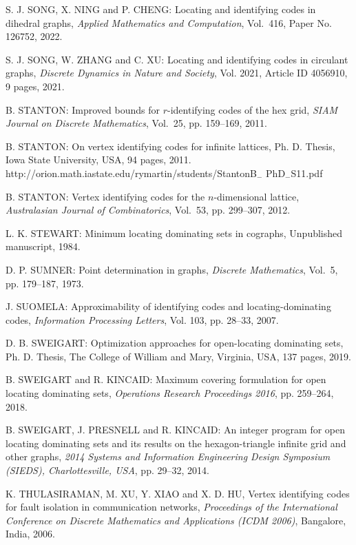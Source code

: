 \begin{thebibliography}{999}
S. J. SONG, X. NING and P. CHENG: Locating and identifying codes in dihedral graphs, {\it Applied Mathematics and Computation}, Vol.~416, Paper No. 126752, 2022.

S. J. SONG, W. ZHANG and C. XU: Locating and identifying codes in circulant graphs, {\it Discrete Dynamics in Nature and Society}, Vol. 2021, Article ID 4056910, 9 pages, 2021.

B. STANTON: Improved bounds for $r$-identifying codes of the hex grid, {\it SIAM Journal on Discrete Mathematics}, Vol.~25, pp. 159--169, 2011.

B. STANTON: On vertex identifying codes for infinite lattices, Ph. D. Thesis, Iowa State University, USA, 94 pages, 2011.\\
http://orion.math.iastate.edu/rymartin/students/StantonB$_{-}$ PhD$_{-}$S11.pdf

B. STANTON: Vertex identifying codes for the $n$-dimensional lattice, {\it Australasian Journal of Combinatorics}, Vol.~53, pp. 299--307, 2012.

L. K. STEWART: Minimum locating dominating sets in cographs, Unpublished manuscript, 1984.

 D. P. SUMNER: Point determination in graphs, {\it Discrete Mathematics}, Vol.~5, pp. 179--187, 1973.

J. SUOMELA: Approximability of identifying codes and locating-dominating codes, {\it Information Processing Letters}, Vol. 103, pp. 28--33, 2007.

D. B. SWEIGART:  Optimization approaches for open-locating dominating sets, Ph. D. Thesis, The College of William and Mary, Virginia, USA, 137 pages, 2019.

B. SWEIGART and R. KINCAID: Maximum covering formulation for open locating dominating sets, {\it Operations Research Proceedings 2016}, pp. 259--264, 2018.

B. SWEIGART, J. PRESNELL and R. KINCAID: An integer program for open locating dominating sets and its results on the hexagon-triangle infinite grid and other graphs, {\it 2014 Systems and Information Engineering Design Symposium (SIEDS), Charlottesville, USA}, pp. 29--32, 2014.
 
K. THULASIRAMAN, M. XU, Y. XIAO and X. D. HU, Vertex identifying codes for fault isolation in communication networks, {\it Proceedings of the International Conference on Discrete Mathematics and Applications (ICDM 2006)}, Bangalore, India, 2006.


\end{thebibliography}
